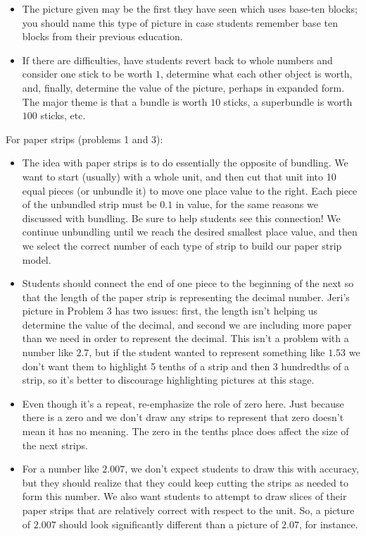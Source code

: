 \documentclass{ximera}
\begin{document}
\begin{instructorNotes}
\begin{itemize}
	\item The picture given may be the first they have seen which uses base-ten blocks; you should name this type of picture in case students remember base ten blocks from their previous education.
	\item If there are difficulties, have students revert back to whole numbers and consider one stick to be worth $1$, determine what each other object is worth, and, finally, determine the value of the picture, perhaps in expanded form.  The major theme is that a bundle is worth $10$ sticks, a superbundle is worth $100$ sticks, etc.
    \end{itemize}

For paper strips (problems 1 and 3):
\begin{itemize}
	\item The idea with paper strips is to do essentially the opposite of bundling. We want to start (usually) with a whole unit, and then cut that unit into 10 equal pieces (or unbundle it) to move one place value to the right. Each piece of the unbundled strip must be $0.1$ in value, for the same reasons we discussed with bundling. Be sure to help students see this connection! We continue unbundling until we reach the desired smallest place value, and then we select the correct number of each type of strip to build our paper strip model. 
	\item Students should connect the end of one piece to the beginning of the next so that the length of the paper strip is representing the decimal number. Jeri's picture in Problem 3 has two issues: first, the length isn't helping us determine the value of the decimal, and second we are including more paper than we need in order to represent the decimal. This isn't a problem with a number like $2.7$, but if the student wanted to represent something like $1.53$ we don't want them to highlight 5 tenths of a strip and then 3 hundredths of a strip, so it's better to discourage highlighting pictures at this stage.
	\item Even though it's a repeat, re-emphasize the role of zero here. Just because there is a zero and we don't draw any strips to represent that zero doesn't mean it has no meaning. The zero in the tenths place does affect the size of the next strips.
	\item For a number like $2.007$, we don't expect students to draw this with accuracy, but they should realize that they could keep cutting the strips as needed to form this number. We also want students to attempt to draw slices of their paper strips that are relatively correct with respect to the unit. So, a picture of $2.007$ should look significantly different than a picture of $2.07$, for instance.
\end{itemize}


\end{instructorNotes}
\end{document}
